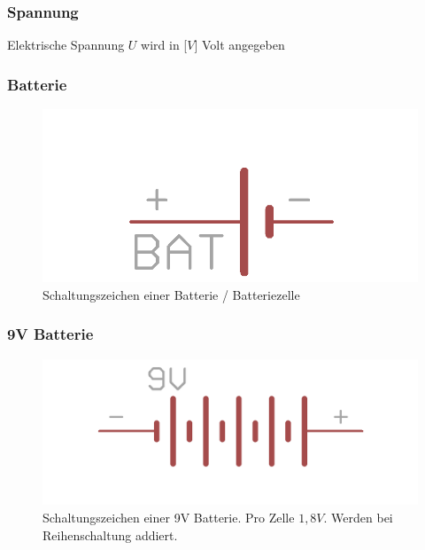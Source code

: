 \begin{frame}
  \frametitle{Spannung}
  \begin{center}
    Elektrische Spannung $U$ wird in [$V$] Volt angegeben
  \end{center}
\end{frame}

\begin{frame}
  \frametitle{Batterie}
  \begin{center}
    \begin{figure}
      \includegraphics[width=\textwidth,height=.5\textheight,keepaspectratio]{e02/batterieEagle.png}
      \caption{Schaltungszeichen einer Batterie / Batteriezelle}
    \end{figure}
  \end{center}
\end{frame}

\begin{frame}
  \frametitle{9V Batterie}
  \begin{center}
    \begin{figure}
      \includegraphics[width=\textwidth,height=.5\textheight,keepaspectratio]{e02/9vBatEagle.png}
      \caption{Schaltungszeichen einer 9V Batterie. Pro Zelle $1,8V$. Werden bei Reihenschaltung addiert.}
    \end{figure}
  \end{center}
\end{frame}

